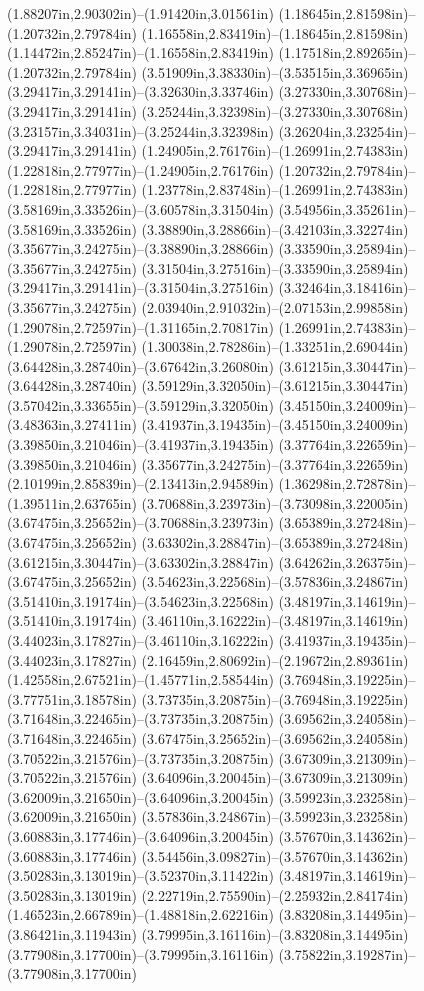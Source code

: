 (1.88207in,2.90302in)--(1.91420in,3.01561in) (1.18645in,2.81598in)--(1.20732in,2.79784in) (1.16558in,2.83419in)--(1.18645in,2.81598in) (1.14472in,2.85247in)--(1.16558in,2.83419in) (1.17518in,2.89265in)--(1.20732in,2.79784in) (3.51909in,3.38330in)--(3.53515in,3.36965in) (3.29417in,3.29141in)--(3.32630in,3.33746in) (3.27330in,3.30768in)--(3.29417in,3.29141in) (3.25244in,3.32398in)--(3.27330in,3.30768in) (3.23157in,3.34031in)--(3.25244in,3.32398in) (3.26204in,3.23254in)--(3.29417in,3.29141in) (1.24905in,2.76176in)--(1.26991in,2.74383in) (1.22818in,2.77977in)--(1.24905in,2.76176in) (1.20732in,2.79784in)--(1.22818in,2.77977in) (1.23778in,2.83748in)--(1.26991in,2.74383in) (3.58169in,3.33526in)--(3.60578in,3.31504in) (3.54956in,3.35261in)--(3.58169in,3.33526in) (3.38890in,3.28866in)--(3.42103in,3.32274in) (3.35677in,3.24275in)--(3.38890in,3.28866in) (3.33590in,3.25894in)--(3.35677in,3.24275in) (3.31504in,3.27516in)--(3.33590in,3.25894in) (3.29417in,3.29141in)--(3.31504in,3.27516in) (3.32464in,3.18416in)--(3.35677in,3.24275in) (2.03940in,2.91032in)--(2.07153in,2.99858in) (1.29078in,2.72597in)--(1.31165in,2.70817in) (1.26991in,2.74383in)--(1.29078in,2.72597in) (1.30038in,2.78286in)--(1.33251in,2.69044in) (3.64428in,3.28740in)--(3.67642in,3.26080in) (3.61215in,3.30447in)--(3.64428in,3.28740in) (3.59129in,3.32050in)--(3.61215in,3.30447in) (3.57042in,3.33655in)--(3.59129in,3.32050in) (3.45150in,3.24009in)--(3.48363in,3.27411in) (3.41937in,3.19435in)--(3.45150in,3.24009in) (3.39850in,3.21046in)--(3.41937in,3.19435in) (3.37764in,3.22659in)--(3.39850in,3.21046in) (3.35677in,3.24275in)--(3.37764in,3.22659in) (2.10199in,2.85839in)--(2.13413in,2.94589in) (1.36298in,2.72878in)--(1.39511in,2.63765in) (3.70688in,3.23973in)--(3.73098in,3.22005in) (3.67475in,3.25652in)--(3.70688in,3.23973in) (3.65389in,3.27248in)--(3.67475in,3.25652in) (3.63302in,3.28847in)--(3.65389in,3.27248in) (3.61215in,3.30447in)--(3.63302in,3.28847in) (3.64262in,3.26375in)--(3.67475in,3.25652in) (3.54623in,3.22568in)--(3.57836in,3.24867in) (3.51410in,3.19174in)--(3.54623in,3.22568in) (3.48197in,3.14619in)--(3.51410in,3.19174in) (3.46110in,3.16222in)--(3.48197in,3.14619in) (3.44023in,3.17827in)--(3.46110in,3.16222in) (3.41937in,3.19435in)--(3.44023in,3.17827in) (2.16459in,2.80692in)--(2.19672in,2.89361in) (1.42558in,2.67521in)--(1.45771in,2.58544in) (3.76948in,3.19225in)--(3.77751in,3.18578in) (3.73735in,3.20875in)--(3.76948in,3.19225in) (3.71648in,3.22465in)--(3.73735in,3.20875in) (3.69562in,3.24058in)--(3.71648in,3.22465in) (3.67475in,3.25652in)--(3.69562in,3.24058in) (3.70522in,3.21576in)--(3.73735in,3.20875in) (3.67309in,3.21309in)--(3.70522in,3.21576in) (3.64096in,3.20045in)--(3.67309in,3.21309in) (3.62009in,3.21650in)--(3.64096in,3.20045in) (3.59923in,3.23258in)--(3.62009in,3.21650in) (3.57836in,3.24867in)--(3.59923in,3.23258in) (3.60883in,3.17746in)--(3.64096in,3.20045in) (3.57670in,3.14362in)--(3.60883in,3.17746in) (3.54456in,3.09827in)--(3.57670in,3.14362in) (3.50283in,3.13019in)--(3.52370in,3.11422in) (3.48197in,3.14619in)--(3.50283in,3.13019in) (2.22719in,2.75590in)--(2.25932in,2.84174in) (1.46523in,2.66789in)--(1.48818in,2.62216in) (3.83208in,3.14495in)--(3.86421in,3.11943in) (3.79995in,3.16116in)--(3.83208in,3.14495in) (3.77908in,3.17700in)--(3.79995in,3.16116in) (3.75822in,3.19287in)--(3.77908in,3.17700in) 